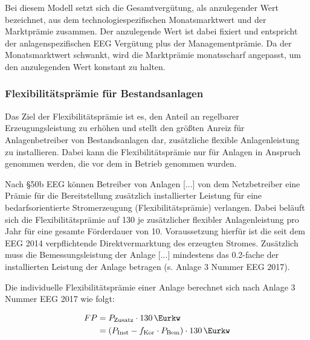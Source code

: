 Bei diesem Modell setzt sich die Gesamtvergütung, als anzulegender Wert bezeichnet, aus dem technologiespezifischen Monatsmarktwert und der Marktprämie zusammen. Der anzulegende Wert ist dabei fixiert und entspricht der anlagenspezifischen \gls{EEG} Vergütung plus der Managementprämie. Da der Monatsmarktwert schwankt, wird die Marktprämie monatsscharf angepasst, um den anzulegenden Wert konstant zu halten. \parencite{NKGH-DV}


\subsubsection{Flexibilitätsprämie für Bestandsanlagen}\label{chap:law_FP}

Das Ziel der Flexibilitätsprämie ist es, den Anteil an regelbarer Erzeugungsleistung zu erhöhen und stellt den größten Anreiz für Anlagenbetreiber von Bestandsanlagen dar, zusätzliche flexible Anlagenleistung zu installieren. Dabei kann die Flexibilitätsprämie nur für Anlagen in Anspruch genommen werden, die vor dem  in Betrieb genommen wurden.\smallskip

Nach \S 50b \gls{EEG} können \glqq Betreiber von Anlagen [...] von dem Netzbetreiber eine Prämie für die Bereitstellung zusätzlich installierter Leistung für eine bedarfsorientierte Stromerzeugung (Flexibilitätsprämie) verlangen.\grqq{} Dabei beläuft sich die Flexibilitätsprämie auf \SI{130}{\sieuro} je \si{\kw} zusätzlicher flexibler Anlagenleistung pro Jahr für eine gesamte Förderdauer von \SI{10}{\Jahren}. Voraussetzung hierfür ist die seit dem \gls{EEG} \SI{2014}{\relax} verpflichtende Direktvermarktung des erzeugten Stromes. Zusätzlich muss \glqq{}die Bemessungsleistung der Anlage [...] mindestens das \SI{0.2}{\relax}-fache der installierten Leistung der Anlage\grqq{} betragen (s. Anlage 3 Nummer  \gls{EEG} \SI{2017}{\relax}). \parencite{BJV2014} \parencite{DanielGromke2019}\smallskip

Die individuelle Flexibilitätsprämie einer Anlage berechnet sich nach Anlage 3 Nummer  \gls{EEG} \SI{2017}{\relax} wie folgt:

\begin{equation}
\begin{split}
	FP & = P_{\text{Zusatz}} \cdot \SI{130}{\Eurkw} \\
	& = \left(P_{\text{Inst}} - f_{\text{Kor}} \cdot P_{\text{Bem}}\right) \cdot \SI{130}{\Eurkw}
\end{split}
\end{equation}

